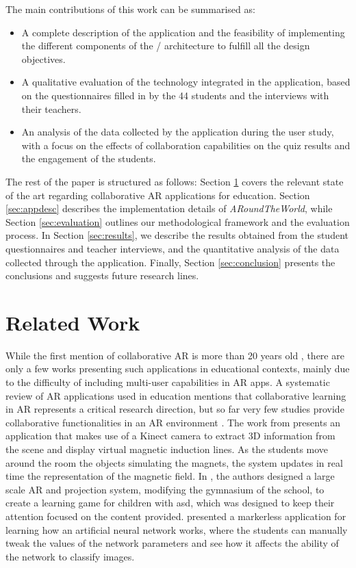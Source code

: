 \documentclass[pdflatex,sn-basic,iicol]{sn-jnl}%
\def\appname/{\textit{ARoundTheWorld}}
\def\numstudents/{44}
\begin{document}
The main contributions of this work can be summarised as:
\begin{itemize}
    \item A complete description of the application and the feasibility of implementing the different components of the \clear/ architecture to fulfill all the design objectives.
    \item A qualitative evaluation of the technology integrated in the application, based on the questionnaires filled in by the \numstudents/ students and the interviews with their teachers.
    \item An analysis of the data collected by the application during the user study, with a focus on the effects of collaboration capabilities on the quiz results and the engagement of the students.
\end{itemize}

The rest of the paper is structured as follows: Section \ref{sec:related} covers the relevant state of the art regarding collaborative AR applications for education. Section \ref{sec:appdesc} describes the implementation details of \appname/, while Section \ref{sec:evaluation} outlines our methodological framework and the evaluation process. In Section \ref{sec:results}, we describe the results obtained from the student questionnaires and teacher interviews, and the quantitative analysis of the data collected through the application. Finally, Section \ref{sec:conclusion} presents the conclusions and suggests future research lines. 

\section{Related Work}\label{sec:related}

While the first mention of collaborative AR is more than 20 years old \citep{billinghurst2002collaborative}, there are only a few works presenting such applications in educational contexts, mainly due to the difficulty of including multi-user capabilities in AR apps. A systematic review of AR applications used in education \citep{eleniiattro} mentions that collaborative learning in AR represents a critical research direction, but so far very few studies provide collaborative functionalities in an AR environment \citep{9645428, choi2017arclassnote}. The work from \cite{cai2017applications} presents an application that makes use of a Kinect camera to extract 3D information from the scene and display virtual magnetic induction lines. As the students move around the room the objects simulating the magnets, the system updates in real time the representation of the magnetic field. In \citep{takahashi2018empathic}, the authors designed a large scale AR and projection system, modifying the gymnasium of the school, to create a learning game for children with \gls{asd}, which was designed to keep their attention focused on the content provided. \cite{laviole2018nectar} presented a markerless application for learning how an artificial neural network works, where the students can manually tweak the values of the network parameters and see how it affects the ability of the network to classify images.
\end{document}

